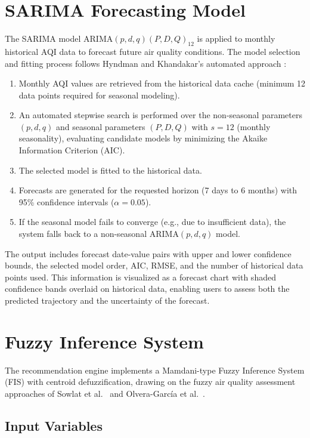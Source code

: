 \documentclass[12pt,a4paper]{report}
\begin{document}
\section{SARIMA Forecasting Model}

The SARIMA model $\text{ARIMA}(p,d,q)(P,D,Q)_{12}$ is applied to monthly historical AQI data to forecast future air quality conditions. The model selection and fitting process follows Hyndman and Khandakar's automated approach \cite{Hyndman2008forecast}:

\begin{enumerate}[leftmargin=*]
  \item Monthly AQI values are retrieved from the historical data cache (minimum 12 data points required for seasonal modeling).
  \item An automated stepwise search is performed over the non-seasonal parameters $(p,d,q)$ and seasonal parameters $(P,D,Q)$ with $s=12$ (monthly seasonality), evaluating candidate models by minimizing the Akaike Information Criterion (AIC).
  \item The selected model is fitted to the historical data.
  \item Forecasts are generated for the requested horizon (7 days to 6 months) with 95\% confidence intervals ($\alpha = 0.05$).
  \item If the seasonal model fails to converge (e.g., due to insufficient data), the system falls back to a non-seasonal $\text{ARIMA}(p,d,q)$ model.
\end{enumerate}

The output includes forecast date-value pairs with upper and lower confidence bounds, the selected model order, AIC, RMSE, and the number of historical data points used. This information is visualized as a forecast chart with shaded confidence bands overlaid on historical data, enabling users to assess both the predicted trajectory and the uncertainty of the forecast.

\section{Fuzzy Inference System}

The recommendation engine implements a Mamdani-type Fuzzy Inference System (FIS) with centroid defuzzification, drawing on the fuzzy air quality assessment approaches of Sowlat et al.~\cite{Sowlat2011faqi} and Olvera-Garc\'ia et al.~\cite{OlveraGarcia2016weighted}.

\subsection{Input Variables}
\end{document}
